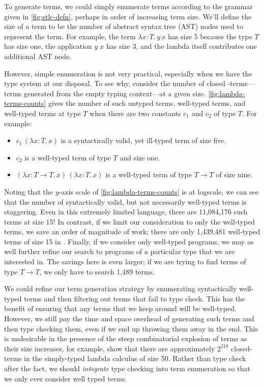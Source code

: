 

To generate \stlc{} terms, we could simply enumerate terms according to the grammar given in \autoref{fig:stlc-defn}, perhaps in order of increasing term size.
We'll define the size of a term to be the number of abstract syntax tree (AST) nodes used to represent the term.
For example, the term $λx{:}T.\,y\,x$ has size 5 because the type $T$ has size one, the application $y\;x$ has size 3, and the lambda itself contributes one additional AST node.

However, simple enumeration is not very practical, especially when we have the type system at our disposal.
To see why, consider the number of closed \stlc-terms---terms generated from the empty typing context---at a given size.
\autoref{fig:lambda-terms-counts} gives the number of such untyped terms, well-typed terms, and well-typed terms at type $T$ when there are two constants $c_1$ and $c_2$ of type $T$.
For example:
\begin{itemize}
  \item $c_1\,(λx{:}T.\,x)$ is a syntactically valid, yet ill-typed term of size five.
  \item $c_2$ is a well-typed term of type $T$ and size one.
  \item $(λx{:}T → T.\,x)\,(λx{:}T.\,x)$ is a well-typed term of type $T → T$ of size nine.
\end{itemize}

Noting that the $y$-axis scale of \autoref{fig:lambda-terms-counts} is at logscale, we can see that the number of syntactically valid, but not necessarily well-typed terms is staggering.
Even in this extremely limited language, there are 11,084,176 such terms at size 15!
In contrast, if we limit our consideration to only the well-typed terms, we save an order of magnitude of work; there are only 1,439,481 well-typed terms of size 15 in \stlc.
Finally, if we consider only well-typed programs, we may as well further refine our search to programs of a particular type that we are interested in.
The savings here is even larger; if we are trying to find terms of type $T → T$, we only have to search 1,489 terms.

We could refine our term generation strategy by enumerating syntactically well-typed terms and then filtering out terms that fail to type check.
This has the benefit of ensuring that any terms that we keep around will be well-typed.
However, we still pay the time and space overhead of generating such terms and then type checking them, even if we end up throwing them away in the end.
This is undesirable in the presence of the steep combinatorial explosion of terms as their size increases, for example, \citet{grygiel-jfp-2013} show that there are approximately $2^{219}$ closed-terms in the simply-typed lambda calculus of size 50.
Rather than type check after the fact, we should \emph{integrate} type checking into term enumeration so that we only ever consider well typed terms.

